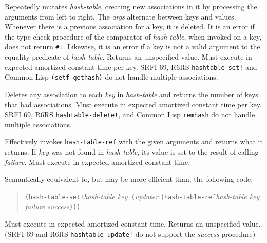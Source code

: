 \begin{entry}{%
  }

  Repeatedly mutates \emph{hash-table}, creating new associations in
  it by processing the arguments from left to right. The \emph{args}
  alternate between keys and values. Whenever there is a previous
  association for a key, it is deleted. It is an error if the type
  check procedure of the comparator of \emph{hash-table}, when invoked
  on a key, does not return \texttt{\#t}. Likewise, it is an error if
  a key is not a valid argument to the equality predicate of
  \emph{hash-table}. Returns an unspecified value. Must execute in
  expected amortized constant time per key. SRFI 69, R6RS
  \texttt{hashtable-set!} and Common Lisp \texttt{(setf\ gethash)} do
  not handle multiple associations.
\end{entry}

\begin{entry}{%
  }

  Deletes any association to each \emph{key} in \emph{hash-table} and
  returns the number of keys that had associations. Must execute in
  expected amortized constant time per key. SRFI 69, R6RS
  \texttt{hashtable-delete!}, and Common Lisp \texttt{remhash} do not
  handle multiple associations.
\end{entry}

\begin{entry}{%
  }

  Effectively invokes \texttt{hash-table-ref} with the given arguments
  and returns what it returns. If \emph{key} was not found in
  \emph{hash-table}, its value is set to the result of calling
  \emph{failure}. Must execute in expected amortized constant time.

\end{entry}

\begin{entry}{%
  }

  Semantically equivalent to, but may be more efficient than, the
  following code:

\begin{quote}
  \texttt{(hash-table-set!}\emph{hash-table key}\texttt{\
    (}\emph{updater} \texttt{(hash-table-ref}\emph{hash-table key
    failure success}\texttt{)))}
\end{quote}

Must execute in expected amortized constant time. Returns an
unspecified value. (SRFI 69 and R6RS \texttt{hashtable-update!} do not
support the \emph{success} procedure)
\end{entry}

